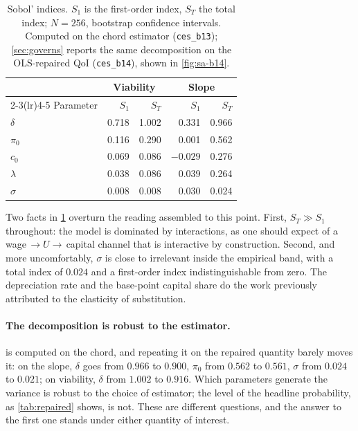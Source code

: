 \begin{table}[htbp]
\centering
\small
\caption{Sobol' indices. $S_1$ is the first-order index, $S_T$ the total
index; $N = 256$, bootstrap confidence intervals. Computed on the chord
estimator (\texttt{ces\_b13}); \cref{sec:governs} reports the same
decomposition on the OLS-repaired QoI (\texttt{ces\_b14}), shown in
\cref{fig:sa-b14}.}
\label{tab:sobol}
\begin{tabular}{lrrrr}
\toprule
& \multicolumn{2}{c}{Viability} & \multicolumn{2}{c}{Slope}\\
\cmidrule(lr){2-3}\cmidrule(lr){4-5}
Parameter & $S_1$ & $S_T$ & $S_1$ & $S_T$\\
\midrule  %
$\delta$        & 0.718 & 1.002 & 0.331 & 0.966\\
$\pi_0$         & 0.116 & 0.290 & 0.001 & 0.562\\
$c_0$           & 0.069 & 0.086 & $-0.029$ & 0.276\\
$\lambda$       & 0.038 & 0.086 & 0.039 & 0.264\\
$\sigma$        & 0.008 & 0.008 & 0.030 & 0.024\\
\bottomrule
\end{tabular}
\end{table}

Two facts in \cref{tab:sobol} overturn the reading assembled to this point. First,
$S_T \gg S_1$ throughout: the model is dominated by interactions, as one
should expect of a wage$\,\to U \to\,$capital channel that is interactive by
construction. Second, and more uncomfortably, $\sigma$ is close to
irrelevant inside the empirical band, with a total index of $0.024$ and a
first-order index indistinguishable from zero. The depreciation rate and the
base-point capital share do the work previously attributed to the
elasticity of substitution.

\paragraph{The decomposition is robust to the estimator.}  is
computed on the chord, and repeating it on the repaired quantity barely moves
it: on the slope, $\delta$ goes from $0.966$ to $0.900$, $\pi_0$ from $0.562$
to $0.561$, $\sigma$ from $0.024$ to $0.021$; on viability, $\delta$ from
$1.002$ to $0.916$. Which parameters generate the variance is robust to
the choice of estimator; the level of the headline probability, as
\cref{tab:repaired} shows, is not. These are different questions, and the
answer to the first one stands under either quantity of interest.

